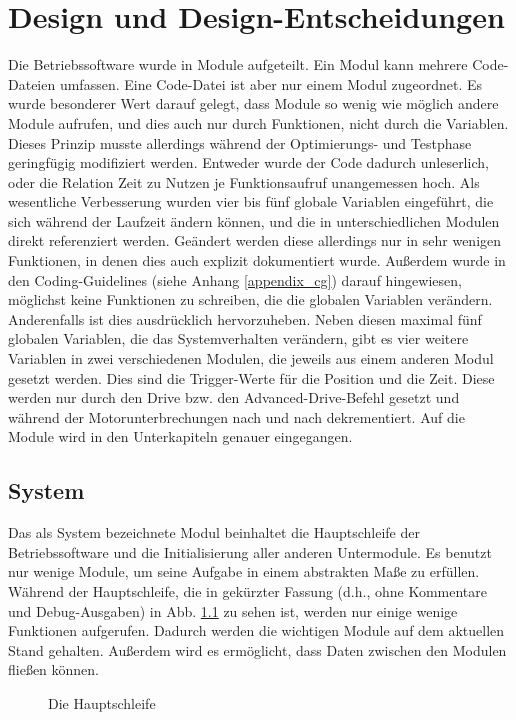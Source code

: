 \chapter{Design und Design-Entscheidungen}
Die Betriebssoftware wurde in Module aufgeteilt. Ein Modul kann mehrere Code-Dateien
umfassen. Eine Code-Datei ist aber nur einem Modul zugeordnet.
Es wurde besonderer Wert darauf gelegt, dass Module so wenig wie möglich andere
Module aufrufen, und dies auch nur durch Funktionen, nicht durch die Variablen.
Dieses Prinzip musste allerdings während der Optimierungs- und Testphase
geringfügig modifiziert werden. Entweder wurde der Code dadurch unleserlich, oder
die Relation Zeit zu Nutzen je Funktionsaufruf unangemessen hoch.
Als wesentliche Verbesserung wurden vier bis fünf globale Variablen eingeführt, die
sich während der Laufzeit ändern können, und die in unterschiedlichen Modulen direkt
referenziert werden.
Geändert werden diese allerdings nur in sehr wenigen Funktionen, in denen dies
auch explizit dokumentiert wurde. Außerdem wurde in den Coding-Guidelines (siehe 
Anhang \ref{appendix_cg}) darauf hingewiesen,
möglichst keine Funktionen zu schreiben, die die globalen Variablen verändern.
Anderenfalls ist dies ausdrücklich hervorzuheben.
Neben diesen maximal fünf globalen Variablen, die das Systemverhalten verändern, gibt es vier
weitere Variablen in zwei verschiedenen Modulen, die jeweils aus einem anderen
Modul gesetzt werden. Dies sind die Trigger-Werte für die Position und
die Zeit. Diese werden nur durch den Drive bzw. den Advanced-Drive-Befehl
gesetzt und während der Motorunterbrechungen nach und nach dekrementiert.
Auf die Module wird in den Unterkapiteln genauer eingegangen.
\section{System}
Das als System bezeichnete Modul beinhaltet die Hauptschleife der Betriebssoftware
und die Initialisierung aller anderen Untermodule. Es benutzt nur wenige Module,
um seine Aufgabe in einem abstrakten Maße zu erfüllen. Während der Hauptschleife, die
in gekürzter Fassung (d.h., ohne Kommentare und Debug-Ausgaben) in Abb. \ref{main_loop} zu sehen ist,
werden nur einige wenige Funktionen aufgerufen. Dadurch werden die wichtigen Module auf dem
aktuellen Stand gehalten. Außerdem wird es ermöglicht, dass Daten zwischen den Modulen fließen können.
\begin{figure}[htb]
 \centering
 \caption{\label{main_loop}Die Hauptschleife}
\end{figure}
